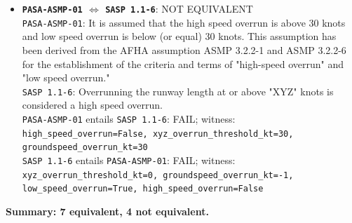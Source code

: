 \documentclass[11pt,a4paper]{article}
\begin{document}
\begin{itemize}
\texttt{ASMP 3.2.2-1}: Overrunning the runway length above "XYZ" knots is considered a high speed overrun. \\
\texttt{SASP 1.1-6}: Overrunning the runway length at or above "XYZ" knots is considered a high speed overrun. \\
\texttt{ASMP 3.2.2-1} entails \texttt{SASP 1.1-6}: FAIL; witness: \texttt{high\_speed\_overrun=False, xyz\_overrun\_threshold\_kt=0, groundspeed\_overrun\_kt=0} \\
\texttt{SASP 1.1-6} entails \texttt{ASMP 3.2.2-1}: PASS
\item \textbf{\texttt{PASA-ASMP-01} $\Leftrightarrow$ \texttt{SASP 1.1-6}}: NOT EQUIVALENT \\
\texttt{PASA-ASMP-01}: It is assumed that the high speed overrun is above 30 knots and low speed overrun is below (or equal) 30 knots. This assumption has been derived from the AFHA assumption ASMP 3.2.2-1 and ASMP 3.2.2-6 for the establishment of the criteria and terms of "high-speed overrun" and "low speed overrun." \\
\texttt{SASP 1.1-6}: Overrunning the runway length at or above "XYZ" knots is considered a high speed overrun. \\
\texttt{PASA-ASMP-01} entails \texttt{SASP 1.1-6}: FAIL; witness: \texttt{high\_speed\_overrun=False, xyz\_overrun\_threshold\_kt=30, groundspeed\_overrun\_kt=30} \\
\texttt{SASP 1.1-6} entails \texttt{PASA-ASMP-01}: FAIL; witness: \texttt{xyz\_overrun\_threshold\_kt=0, groundspeed\_overrun\_kt=-1, low\_speed\_overrun=True, high\_speed\_overrun=False}
\end{itemize}
\textbf{Summary: 7 equivalent, 4 not equivalent.}
\end{document}
